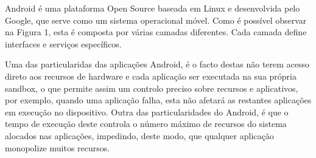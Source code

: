 Android é uma plataforma Open Source baseada em Linux e desenvolvida pelo Google, que serve como um sistema operacional móvel.
Como é possível observar na Figura 1, esta é composta por várias camadas diferentes. Cada camada define interfaces e serviços específicos.


Uma das particularidas das aplicações Android, é o facto destas não terem acesso direto aos recursos de hardware e cada aplicação ser executada na sua própria sandbox, o que permite assim um controlo preciso sobre recursos e aplicativos, por exemplo, quando uma aplicação falha, esta não afetará as restantes aplicações em execução no dispositivo. Outra das particularidades do Android, é que o tempo de execução deste controla o número máximo de recursos do sistema alocados nas aplicações, impedindo, deste modo, que qualquer aplicação monopolize muitos recursos.



